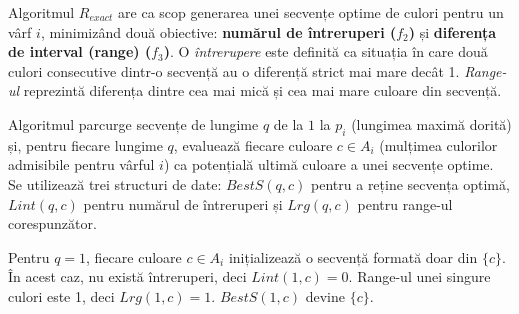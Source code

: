 \begin{algorithm}[H]
\caption{$R_{exact}$}\label{alg:Rexact}
\begin{algorithmic}[1]
\small
{}
       
    \Else{}
        \Else{}
        \EndIf{}
        \EndIf{}
      \EndFor{}
        \EndIf{}
      \EndFor{}
    \EndIf{}
  \EndFor{}
\EndFor{}
\end{algorithmic}
\end{algorithm}

Algoritmul $R_{exact}$ are ca scop generarea unei secvențe optime de culori pentru un vârf $i$, minimizând două obiective: \textbf{numărul de întreruperi ($f_2$)} și \textbf{diferența de interval (range) ($f_3$)}. O \textit{întrerupere} este definită ca situația în care două culori consecutive dintr-o secvență au o diferență strict mai mare decât 1. \textit{Range-ul} reprezintă diferența dintre cea mai mică și cea mai mare culoare din secvență.

Algoritmul parcurge secvențe de lungime $q$ de la $1$ la $p_i$ (lungimea maximă dorită) și, pentru fiecare lungime $q$, evaluează fiecare culoare $c \in A_i$ (mulțimea culorilor admisibile pentru vârful $i$) ca potențială ultimă culoare a unei secvențe optime. Se utilizează trei structuri de date: $BestS(q, c)$ pentru a reține secvența optimă, $Lint(q, c)$ pentru numărul de întreruperi și $Lrg(q, c)$ pentru range-ul corespunzător.

Pentru $q = 1$, fiecare culoare $c \in A_i$ inițializează o secvență formată doar din $\{c\}$. În acest caz, nu există întreruperi, deci $Lint(1, c) = 0$. Range-ul unei singure culori este 1, deci $Lrg(1, c) = 1$. $BestS(1, c)$ devine $\{c\}$.


